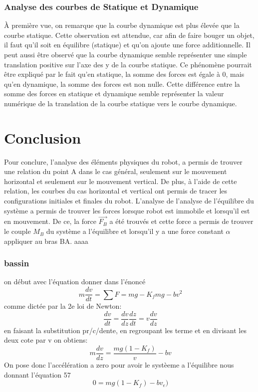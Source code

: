 \documentclass{article}
\begin{document}
\subsubsection{Analyse des courbes de Statique et Dynamique}
\noindent
À première vue, on remarque que la courbe dynamique est plus élevée que la courbe statique. Cette observation est attendue, car afin de faire bouger un objet, il faut qu'il soit en équilibre (statique) et qu'on ajoute une force additionnelle. Il peut aussi être observé que la courbe dynamique semble représenter une simple translation positive sur l'axe des y de la courbe statique. Ce phénomène pourrait être expliqué par le fait qu'en statique, la somme des forces est égale à 0, mais qu'en dynamique, la somme des forces est non nulle. Cette différence entre la somme des forces en statique et dynamique semble représenter la valeur numérique de la translation de la courbe statique vers le courbe dynamique.

\section{Conclusion}
\noindent
Pour conclure, l'analyse des éléments physiques du robot, a permis de trouver une relation du point A dans le cas général, seulement sur le mouvement horizontal et seulement sur le mouvement vertical. De plus, à l'aide de cette relation, les courbes du cas horizontal et vertical ont permis de tracer les configurations initiales et finales du robot. L'analyse de l'analyse de l'équilibre du système a permis de trouver les forces lorsque robot est immobile et lorsqu'il est en mouvement. De ce, la force $\overrightarrow{F_B}$ a été trouvés et cette force a permis de trouver le couple $M_B$ du système a l'équilibre et lorsqu'il y a une force constant $\alpha$ appliquer au bras BA.
aaaa

\subsubsection{bassin}

on début avec l'équation donner dans l'énoncé
\begin{equation}
\ m \frac{dv}{dt} = \sum F = mg - K_{f}mg - bv^2
\end{equation}
comme dictée par la 2e loi de Newton:
\begin{equation}
\ \frac{dv}{dt} = \frac{dv}{dz} \frac{dz}{dt} = v\frac{dv}{dz}
\end{equation}
en faisant la substitution pr/c/dente, en regroupant les terme et en divisant les deux cote par v on obtiens:
\begin{equation}
\ m\frac{dv}{dz} =  \frac{mg ( 1- K_{f})}{v} - bv
\end{equation}
On pose donc l'accélération a zero pour avoir le systèeme a l'équilibre nous donnant l'équation 57
\begin{equation}
\ 0 =  mg ( 1- K_{f}) - bv_{e})
\end{equation}
\end{document}
